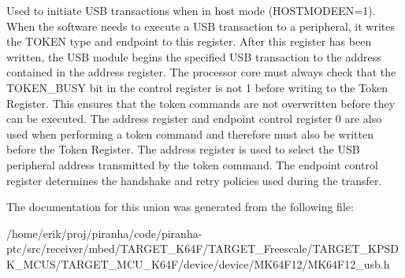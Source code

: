 Used to initiate U\+SB transactions when in host mode (H\+O\+S\+T\+M\+O\+D\+E\+EN=1). When the software needs to execute a U\+SB transaction to a peripheral, it writes the T\+O\+K\+EN type and endpoint to this register. After this register has been written, the U\+SB module begins the specified U\+SB transaction to the address contained in the address register. The processor core must always check that the T\+O\+K\+E\+N\+\_\+\+B\+U\+SY bit in the control register is not 1 before writing to the Token Register. This ensures that the token commands are not overwritten before they can be executed. The address register and endpoint control register 0 are also used when performing a token command and therefore must also be written before the Token Register. The address register is used to select the U\+SB peripheral address transmitted by the token command. The endpoint control register determines the handshake and retry policies used during the transfer. 

The documentation for this union was generated from the following file\+:\begin{DoxyCompactItemize}
\item 
/home/erik/proj/piranha/code/piranha-\/ptc/src/receiver/mbed/\+T\+A\+R\+G\+E\+T\+\_\+\+K64\+F/\+T\+A\+R\+G\+E\+T\+\_\+\+Freescale/\+T\+A\+R\+G\+E\+T\+\_\+\+K\+P\+S\+D\+K\+\_\+\+M\+C\+U\+S/\+T\+A\+R\+G\+E\+T\+\_\+\+M\+C\+U\+\_\+\+K64\+F/device/device/\+M\+K64\+F12/M\+K64\+F12\+\_\+usb.\+h\end{DoxyCompactItemize}
